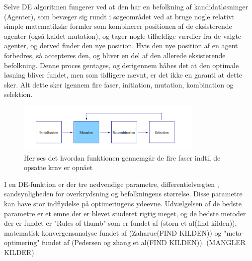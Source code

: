 \par
Selve DE algoritmen fungerer ved at den har en befolkning af kandidatløsninger (Agenter), som bevæger sig rundt i søgeområdet ved at bruge nogle relativt simple matematikske formler som kombinerer positionen af de eksisterende agenter (også kaldet mutation), og tager nogle tilfældige værdier fra de valgte agenter, og derved finder den nye position. Hvis den nye position af en agent forbedres, så accepteres den, og bliver en del af den allerede eksisterende befolkning. Denne proces gentages, og derigennem håbes det at den optimale løsning bliver fundet, men som tidligere nævnt, er det ikke en garanti at dette sker. Alt dette sker igennem fire faser, initiation, mutation, kombination og selektion.
\begin{figure}[H]
    \centering
    \includegraphics[width=0.8\textwidth]{figures/tur.PNG}
    \caption{Her ses det hvordan funktionen gennemgår de fire faser indtil de opsatte krav er opnået}
    \label{tur}
\end{figure}
I en DE-funktion er der tre nødvendige parametre, differentielvægten , sandsynligheden for overkrydsning og befolkningens størrelse. Disse parametre kan have stor indflydelse på optimeringens ydeevne. Udvælgelsen af de bedste parametre er et emne der er blevet studeret rigtig meget, og de bedste metoder der er fundet er "Rules of thumb" som er fundet af (storn et al(find kilden)), matematisk konvergensanalyse fundet af (Zaharue(FIND KILDEN)) og "meta-optimering" fundet af (Pedersen og zhang et al(FIND KILDEN)).
(MANGLER KILDER)
